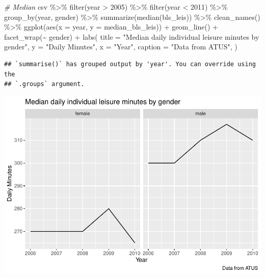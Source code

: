 \documentclass[
]{article}
\newenvironment{Shaded}{\begin{snugshade}}{\end{snugshade}}
\newcommand{\AttributeTok}[1]{\textcolor[rgb]{0.77,0.63,0.00}{#1}}
\newcommand{\CommentTok}[1]{\textcolor[rgb]{0.56,0.35,0.01}{\textit{#1}}}
\newcommand{\DecValTok}[1]{\textcolor[rgb]{0.00,0.00,0.81}{#1}}
\newcommand{\FunctionTok}[1]{\textcolor[rgb]{0.00,0.00,0.00}{#1}}
\newcommand{\NormalTok}[1]{#1}
\newcommand{\SpecialCharTok}[1]{\textcolor[rgb]{0.00,0.00,0.00}{#1}}
\newcommand{\StringTok}[1]{\textcolor[rgb]{0.31,0.60,0.02}{#1}}
\begin{document}
\begin{Shaded}
\begin{Highlighting}[]
\CommentTok{\# Median }
\NormalTok{csv }\SpecialCharTok{\%\textgreater{}\%}
  \FunctionTok{filter}\NormalTok{(year }\SpecialCharTok{\textgreater{}} \DecValTok{2005}\NormalTok{) }\SpecialCharTok{\%\textgreater{}\%}
  \FunctionTok{filter}\NormalTok{(year }\SpecialCharTok{\textless{}} \DecValTok{2011}\NormalTok{) }\SpecialCharTok{\%\textgreater{}\%}
  \FunctionTok{group\_by}\NormalTok{(year, gender) }\SpecialCharTok{\%\textgreater{}\%}
  \FunctionTok{summarize}\NormalTok{(}\FunctionTok{median}\NormalTok{(bls\_leis)) }\SpecialCharTok{\%\textgreater{}\%}
  \FunctionTok{clean\_names}\NormalTok{() }\SpecialCharTok{\%\textgreater{}\%}
  \FunctionTok{ggplot}\NormalTok{(}\FunctionTok{aes}\NormalTok{(}\AttributeTok{x =}\NormalTok{ year, }\AttributeTok{y =}\NormalTok{ median\_bls\_leis)) }\SpecialCharTok{+}
  \FunctionTok{geom\_line}\NormalTok{() }\SpecialCharTok{+}
  \FunctionTok{facet\_wrap}\NormalTok{(}\SpecialCharTok{\textasciitilde{}}\NormalTok{ gender) }\SpecialCharTok{+}
  \FunctionTok{labs}\NormalTok{(}
  \AttributeTok{title =} \StringTok{"Median daily individual leisure minutes by gender"}\NormalTok{,}
  \AttributeTok{y =} \StringTok{"Daily Minutes"}\NormalTok{,}
  \AttributeTok{x =} \StringTok{"Year"}\NormalTok{,}
  \AttributeTok{caption =} \StringTok{"Data from ATUS"}\NormalTok{,}
\NormalTok{) }
\end{Highlighting}
\end{Shaded}

\begin{verbatim}
## `summarise()` has grouped output by 'year'. You can override using the
## `.groups` argument.
\end{verbatim}

\includegraphics{Paper2_files/figure-latex/graphs-6.pdf}
\end{document}
